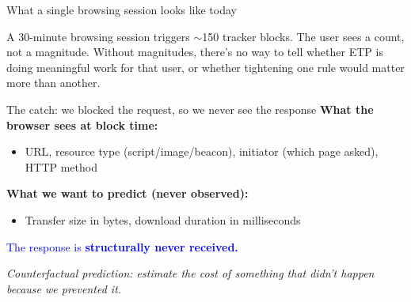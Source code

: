 \documentclass[10pt,aspectratio=169]{beamer}
\begin{document}
\begin{frame}{What a single browsing session looks like today}
    \centering

    \vspace{0.8em}
    \small
    A 30-minute browsing session triggers $\sim$150 tracker blocks. The user sees a count, not a magnitude. Without magnitudes, there's no way to tell whether ETP is doing meaningful work for that user, or whether tightening one rule would matter more than another.
\end{frame}

\begin{frame}{The catch: we blocked the request, so we never see the response}
    \textbf{What the browser sees at block time:}
    \begin{itemize}
        \item URL, resource type (script/image/beacon), initiator (which page asked), HTTP method
    \end{itemize}

    \vspace{0.5em}
    \textbf{What we want to predict (never observed):}
    \begin{itemize}
        \item Transfer size in bytes, download duration in milliseconds
    \end{itemize}

    \vspace{0.7em}
    \textcolor{blue}{The response is \textbf{structurally never received.}}

    \vspace{0.4em}
    \small
    \textit{Counterfactual prediction: estimate the cost of something that didn't happen because we prevented it.}
\end{frame}
\end{document}

